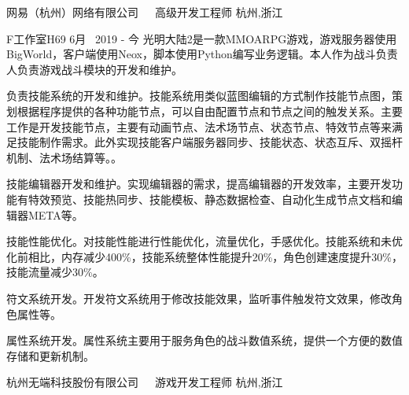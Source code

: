 


\begin{cventries}

\cventrycompany
{网易（杭州）网络有限公司~~~高级开发工程师} %
{杭州,浙江} %

\cventryproject
{F工作室H69} %
{6月~ 2019 - 今} %
{光明大陆2是一款MMOARPG游戏，游戏服务器使用BigWorld，客户端使用Neox，脚本使用Python编写业务逻辑。本人作为战斗负责人负责游戏战斗模块的开发和维护。}
{ %
	\begin{cvitems}
		\item {负责技能系统的开发和维护。技能系统用类似蓝图编辑的方式制作技能节点图，策划根据程序提供的各种功能节点，可以自由配置节点和节点之间的触发关系。主要工作是开发技能节点，主要有动画节点、法术场节点、状态节点、特效节点等来满足技能制作需求。此外实现技能客户端服务器同步、技能状态、状态互斥、双摇杆机制、法术场结算等。}。
		\item{技能编辑器开发和维护。实现编辑器的需求，提高编辑器的开发效率，主要开发功能有特效预览、技能热同步、技能模板、静态数据检查、自动化生成节点文档和编辑器META等。}
		\item{技能性能优化。对技能性能进行性能优化，流量优化，手感优化。技能系统和未优化前相比，内存减少400\%，技能系统整体性能提升20\%，角色创建速度提升30\%，技能流量减少30\%。}
		\item{符文系统开发。开发符文系统用于修改技能效果，监听事件触发符文效果，修改角色属性等。}
		\item{属性系统开发。属性系统主要用于服务角色的战斗数值系统，提供一个方便的数值存储和更新机制。}
	\end{cvitems}
}


\cventrycompany
{杭州无端科技股份有限公司~~~游戏开发工程师} %
{杭州,浙江} %


\end{cventries}
